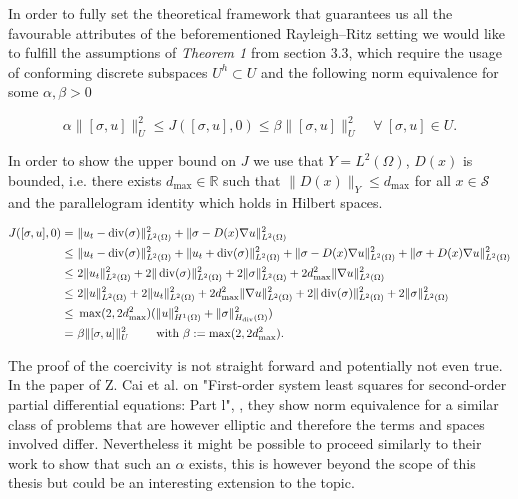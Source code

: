 \documentclass[../draft_1.tex]{subfiles}
\begin{document}
In order to fully set the theoretical framework that guarantees us all the favourable attributes of the beforementioned Rayleigh--Ritz setting we would like to fulfill the assumptions of \textit{Theorem 1} from section 3.3, which require the usage of conforming discrete subspaces $U^h \subset U$ and the following norm equivalence for some $\alpha, \beta > 0$
\begin{ceqn}
	\begin{equation}
	\alpha \|[\sigma, u]\|_U^2 \leq J([\sigma, u], 0) \leq \beta \|[\sigma, u]\|_U^2  \quad \forall \  [\sigma, u] \in U.
	\end{equation}
\end{ceqn}
In order to show the upper bound on $J$ we use that $Y = L^2(\Omega)$, $D(x)$ is bounded, i.e. there exists $d_{\text{max}} \in \mathbb{R}$ such that $\| D(x) \|_Y \leq d_{\text{max}}$ for all $x \in \mathcal{S}$ and the parallelogram identity which holds in Hilbert spaces. 
\begin{ceqn}
	\begin{equation}
	\begin{aligned}
	J([\sigma, u], 0) = \  & \| u_t - \mathop{}\!\mathrm{div}(\sigma) \|_{L^2(\Omega)}^2 + \| \sigma - D(x) \nabla u \|_{L^2(\Omega)}^2 \\  
	\leq \ & \| u_t - \mathop{}\!\mathrm{div}(\sigma) \|_{L^2(\Omega)}^2 + \| u_t + \mathop{}\!\mathrm{div}(\sigma) \|_{L^2(\Omega)}^2 + \| \sigma - D(x) \nabla u \|_{L^2(\Omega)}^2 +  \| \sigma + D(x) \nabla u \|_{L^2(\Omega)}^2 \\
	\leq \ & 2 \| u_t \|_{L^2(\Omega)}^2 + 2 \| \mathop{}\!\mathrm{div}(\sigma) \|_{L^2(\Omega)}^2 + 2 \| \sigma \|_{L^2(\Omega)}^2+ 2 d_{\max}^2 \| \nabla u \|_{L^2(\Omega)}^2  \\
	\leq \ & 2 \| u \|_{L^2(\Omega)}^2 + 2 \| u_t \|_{L^2(\Omega)}^2 + 2 d_{\max}^2 \| \nabla u \|_{L^2(\Omega)}^2 + 2 \| \mathop{}\!\mathrm{div}(\sigma) \|_{L^2(\Omega)}^2 + 2 \| \sigma \|_{L^2(\Omega)}^2 \\
	\leq \ & \max(2, 2 d_{\max}^2) (\| u \|_{H^1(\Omega)}^2 + \| \sigma \|_{H_{\mathop{}\!\mathrm{div}}(\Omega)}^2)	\\
	=  \ & \beta \| [\sigma, u] \|_U^2 \qquad \text{ with } \beta:= \max(2, 2 d_{\max}^2).
	\end{aligned}
	\end{equation}
\end{ceqn}
The proof of the coercivity is not straight forward and potentially not even true. In the paper of Z. Cai et al. on "First-order system least squares for second-order partial differential equations: Part l", \cite{cai1994first}, they show norm equivalence for a similar class of problems that are however elliptic and therefore the terms and spaces involved differ. Nevertheless it might be possible to proceed similarly to their work to show that such an $\alpha$ exists, this is however beyond the scope of this thesis but could be an interesting extension to the topic.
\end{document}
